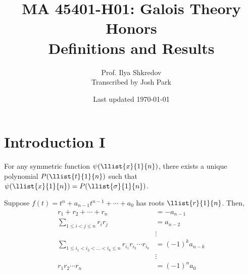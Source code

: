 \documentclass{article}
\title{MA 45401-H01: Galois Theory Honors\\Definitions and Results}
\author{Prof. Ilya Shkredov\\Transcribed by Josh Park}
\date{Last updated \today}
\begin{document}
\section{Introduction I}


\begin{ttheorem}
  For any symmetric function \( \psi(\llist{x}{1}{n}) \), there exists a unique polynomial \( P(\llist{t}{1}{n}) \) such that \( \psi(\llist{x}{1}{n}) = P(\llist{\sigma}{1}{n}) \).
\end{ttheorem}

\begin{tdefinition}
Suppose \( f(t) = t^{n} + a_{n-1} t^{n-1} + \cdots + a_{0} \) has roots \( \llist{r}{1}{n} \).
Then,
  \begin{align*}
  r_1 + r_2 + \cdots + r_n &= -a_{n-1} \\
  \sum_{1 \le i < j \le n} r_i r_j &= a_{n-2} \\
  &\vdots \\
  \sum_{1 \le i_1 < i_2 < \dots < i_k \le n} r_{i_{1}}r_{i_{2}}\cdots r_{i_{k}} &= (-1)^k a_{n-k} \\
  &\vdots \\
  r_1 r_2 \cdots r_n &= (-1)^n a_0
  \end{align*}
\end{tdefinition}
\end{document}
